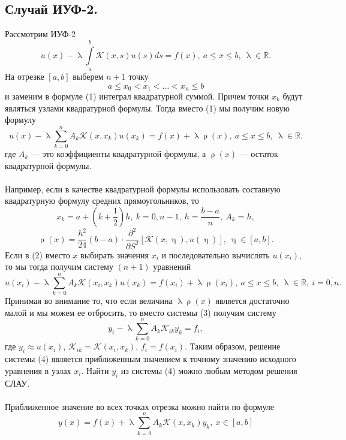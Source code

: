\documentclass[a4paper, 12pt]{report}
\numberwithin{equation}{section}
\newcommand{\Rm}{\mathbb{R}}
\renewcommand{\leq}{\leqslant}
\renewcommand{\eta}{\upeta}
\renewcommand{\lambda}{\uplambda}
\renewcommand{\rho}{\uprho}
\begin{document}
	\subsection{Случай ИУФ-2.}
	Рассмотрим ИУФ-2 
	\begin{equation}
		u(x) - \lambda \int\limits_a^b \mathcal K(x,s)u(s)ds = f(x),\ a\leq x \leq b,\ \lambda \in \Rm.
	\end{equation}
	На отрезке $[a,b]$ выберем $n+1$ точку $$a \leq x_0 < x_1 <\ldots < x_n \leq b$$ и заменим в формуле (1) интеграл квадратурной суммой. Причем точки $x_k$ будут являться узлами квадратурной формулы. Тогда вместо (1) мы получим новую формулу 
	\begin{equation}
		u(x) - \lambda \sum_{k=0}^{n}A_k \mathcal K(x,x_k)u(x_k) = f(x) + \lambda \rho(x),\ a\leq x \leq b,\ \lambda \in \Rm.
	\end{equation}
	где $A_k$ --- это коэффициенты квадратурной формулы, а $\rho(x)$ --- остаток квадратурной формулы.\\\\
	Например, если в качестве квадратурной формулы использовать составную квадратурную формулу средних прямоугольников, то $$x_k = a + \left(k + \dfrac12\right)h,\ k = \overline{0,n-1},\ h =\dfrac{b-a}{n},\ A_k = h,$$ $$\rho(x) = \dfrac{h^2}{24}(b-a)\cdot \dfrac{\partial^2}{\partial S^2}[\mathcal K(x,\eta), u(\eta)],\ \eta \in [a,b].$$
	Если в (2) вместо $x$ выбирать значения $x_i$ и последовательно вычислять $u(x_i)$, то мы тогда получим систему $(n+1)$ уравнений
	\begin{equation}
		u(x_i) - \lambda \sum_{k=0}^{n}A_k \mathcal K(x_i,x_k)u(x_k) = f(x_i) + \lambda \rho(x_i),\ a\leq x \leq b,\ \lambda \in \Rm,\ i=\overline{0,n}.
	\end{equation}
	Принимая во внимание то, что если величина $\lambda \rho(x)$ является достаточно малой и мы можем ее отбросить, то вместо системы (3) получим систему \begin{equation}
		y_i - \lambda \sum_{k=0}^{n}A_k \mathcal K_{ik}y_k = f_i,
	\end{equation}
	где $y_i \approx u(x_i)$, $\mathcal K_{ik} = \mathcal K(x_i, x_k)$, $f_i=f(x_i)$. Таким образом, решение системы (4) является приближенным значением к точному значению исходного уравнения в узлах $x_i$. Найти $y_i$ из системы (4) можно любым методом решения СЛАУ.\\\\
	Приближенное значение во всех точках отрезка можно найти по формуле \begin{equation}
		y(x) = f(x) + \lambda \sum_{k=0}^n A_k\mathcal K (x, x_k)y_k,\ x\in [a,b]
	\end{equation}
\end{document}
